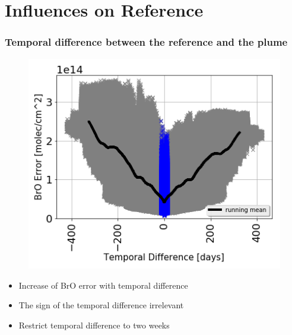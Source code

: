 \documentclass[aspectratio=169]{beamer} %
\begin{document}
		\section{Influences on Reference}
		\begin{frame}
			\frametitle{\color{mygreen}Temporal difference between the reference and the plume \\%
				\color{mygreen}{\rule{0.8\textwidth}{2pt}}}
			\vspace{-0.51cm}
			\begin{multicols}{2}
				\vspace{-4cm}
				\begin{figure}
					\centering
					\includegraphics[width=0.85\linewidth]{../../Bilder/Datum}
					\label{fig:Datum}
				\end{figure}
				\vspace*{0.5cm}
				\begin{itemize}
					\item Increase of BrO error with temporal difference
					\item The sign of the temporal difference irrelevant
					\item Restrict temporal difference to two weeks
				\end{itemize}
			\end{multicols}
			
		\end{frame}
		
\end{document}
